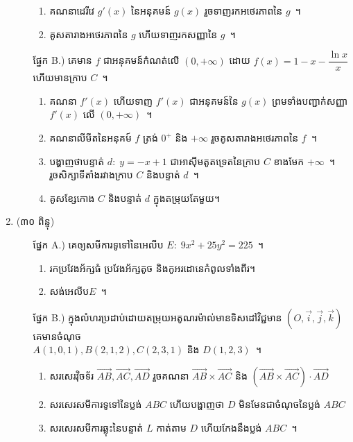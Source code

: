\documentclass[12pt,a4paper]{article}
\begin{document}
\begin{enumerate}
\begin{itemize}
		\begin{enumerate}
			\item គណនាដេរីវេ $ g'(x) $ នៃអនុគមន៍ $ g(x) $ រួចទាញរកអថេរភាពនៃ $ g $~។
			\item គូសតារាងអថេរភាពនៃ $ g $ ហើយទាញរកសញ្ញានៃ $ g $~។
		\end{enumerate}
		\item[ផ្នែក B.)] គេមាន $ f $ ជាអនុគមន៍កំណត់លើ $ (0,+\infty) $ ដោយ $ f(x)=1-x-\dfrac{\ln x}{x} $ ហើយមានក្រាប $ C $~។
		\begin{enumerate}
			\item គណនា $ f'(x) $ ហើយទាញ $ f'(x) $ ជាអនុគមន៍នៃ $ g(x) $ ព្រមទាំងបញ្ជាក់សញ្ញា $ f'(x) $ លើ $ (0,+\infty) $~។
			\item គណនាលីមីត​នៃអនុគម៍ $ f $ ត្រង់ $ 0^+ $ និង $ +\infty $ រួចគូសតារាងអថេរភាពនៃ $ f $~។
			\item បង្ហាញថាបន្ទាត់ $ d:\;y=-x+1 $ ជាអាស៊ីមតូតទ្រេតនៃក្រាប $ C $ ខាងមែក $ +\infty $~។\\
			រួចសិក្សាទីតាំងរវាងក្រាប $ C $ និងបន្ទាត់ $ d $~។
			\item គូសខ្សែកោង $ C $ និងបន្ទាត់ $ d $ ក្នុងតម្រុយតែមួយ។
		\end{enumerate}
	\end{itemize}
	\item (៣០ ពិន្ទុ) 
	\begin{itemize}
		\item[ផ្នែក A.)] គេឲ្យសមីការទូទៅនៃអេលីប $ E:\;9x^2+25y^2=225 $~។
		\begin{enumerate}
			\item រកប្រវែងអ័ក្សធំ ប្រវែងអ័ក្សតូច និងកូអរដោនេកំពូលទាំងពីរ។
			\item សង់អេលីប​ $ E $~។
		\end{enumerate}
		\item[ផ្នែក B.)] ក្នុងលំហរប្រដាប់ដោយតម្រុយអតូណរម៉ាល់មានទិសដៅវិជ្ជមាន $ (O,\vec{i},\vec{j},\vec{k}) $ គេមានចំណុច​\\
		$ A(1,0,1),B(2,1,2),C(2,3,1) $ និង $ D(1,2,3) $~។
		\begin{enumerate}
			\item សរសេរវ៉ិចទ័រ $ \overrightarrow{AB},\overrightarrow{AC},\overrightarrow{AD} $ រួចគណនា $ \overrightarrow{AB}\times\overrightarrow{AC} $ និង $ (\overrightarrow{AB}\times\overrightarrow{AC})\cdot\overrightarrow{AD} $
			\item សរសេរសមីការទូទៅនៃប្លង់ $ ABC $ ហើយបង្ហាញថា $ D $ មិនមែនជាចំណុចនៃប្លង់ $ ABC $
			\item សរសេរសមីការឆ្លុះនៃបន្ទាត់ $ L $ កាត់តាម $ D $ ហើយកែងនឹងប្លង់ $ ABC $~។
		\end{enumerate}
	\end{itemize}
\end{enumerate}
\end{document}
